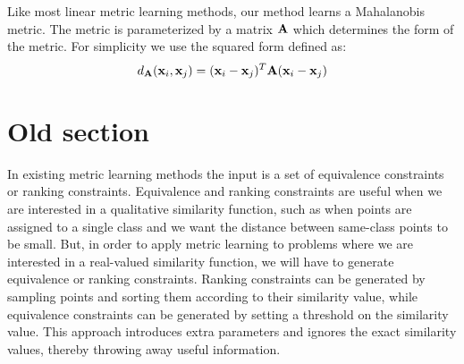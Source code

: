 Like most linear metric learning methods, our method learns a Mahalanobis metric.
The metric is parameterized by a matrix $\mathbf{A}$ which determines the form of the metric.
For simplicity we use the squared form defined as:
\begin{equation}
d_{\mathbf{A}}(\mathbf{x}_i, \mathbf{x}_j) = (\mathbf{x}_i - \mathbf{x}_j)^T \mathbf{A} (\mathbf{x}_i - \mathbf{x}_j)
\end{equation}









\section*{Old section}


In existing metric learning methods the input is a set of equivalence constraints or ranking constraints. Equivalence and ranking constraints are useful when we are interested in a qualitative similarity function, such as when points are assigned to a single class and we want the distance between same-class points to be small. But, in order to apply metric learning to problems where we are interested in a real-valued similarity function, we will have to generate equivalence or ranking constraints. Ranking constraints can be generated by sampling points and sorting them according to their similarity value, while equivalence constraints can be generated by setting a threshold on the similarity value. This approach introduces extra parameters and ignores the exact similarity values, thereby throwing away useful information.


